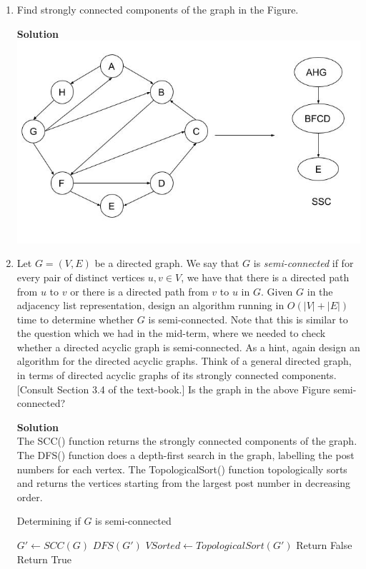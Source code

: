 \documentclass[12pt]{article}
\begin{document}
\begin{enumerate}

\item \color{blue}Find strongly connected components of the graph in the Figure.

\color{black}
\textbf{Solution}\\
\includegraphics[scale=0.5]{q1}

\item \color{blue} Let $G=(V,E)$ be a directed graph. We say that $G$ is {\em semi-connected} if for every pair of distinct vertices $u,v\in V$,  we have that there is a directed path from $u$ to $v$ or there is a directed path from $v$ to $u$ in $G$.  Given $G$ in the adjacency list representation, design an algorithm running in $O(|V|+|E|)$ time to determine whether $G$ is semi-connected. Note that this is similar to the question which we had in the mid-term, where we needed to check whether a directed acyclic graph is semi-connected.  As a hint, again design an algorithm for the directed acyclic graphs. Think of a general directed graph, in terms of directed acyclic graphs of its strongly connected components. [Consult Section 3.4 of the text-book.] 
Is the graph in the above Figure semi-connected?

\color{black}
\textbf{Solution}\\
The SCC() function returns the strongly connected components of the graph.
The DFS() function does a depth-first search in the graph, labelling the post numbers for each vertex.
The TopologicalSort() function topologically sorts and returns the vertices starting from the largest post number in decreasing order.

\newpage
\begin{algorithm}
\caption{Determining if $G$ is semi-connected}
\begin{algorithmic}[1]
	\State $G'\gets SCC(G)$ 
	\State $DFS(G')$ 
	\State $VSorted \gets TopologicalSort(G')$ 
			\State Return False
		\EndIf
	\EndFor
	\State Return True
\EndProcedure
\end{algorithmic}
\end{algorithm}


\end{enumerate}
\end{document}
